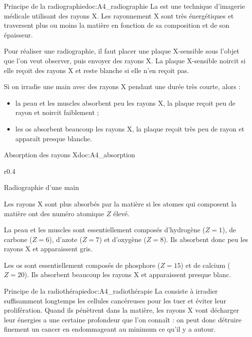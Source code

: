 \begin{doc}{Principe de la radiographie}{doc:A4_radiographie}
  La  est une technique d'imagerie médicale utilisant des rayons X.
  Les rayonnement X sont très énergétiques et traversent plus ou moins la matière en fonction de sa composition et de son épaisseur.

  Pour réaliser une radiographie, il faut placer une plaque X-sensible sous l'objet que l'on veut observer, puis envoyer des rayons X.
  La plaque X-sensible noircit si elle reçoit des rayons X et reste blanche si elle n'en reçoit pas.

  Si on irradie une main avec des rayons X pendant une durée très courte, alors :
  \begin{itemize}
    \item la peau et les muscles absorbent peu les rayons X, la plaque reçoit peu de rayon et noircit faiblement ;
    \item les os absorbent beaucoup les rayons X, la plaque reçoit très peu de rayon et apparaît presque blanche.
  \end{itemize}
\end{doc}

\begin{doc}{Absorption des rayons X}{doc:A4_absorption}
  \begin{wrapfigure}{r}{0.4\linewidth}
    \vspace*{-34pt}

    \centering Radiographie d'une main    
  \end{wrapfigure}
  
  Les rayons X sont plus absorbés par la matière si les atomes qui composent la matière ont des numéro atomique $Z$ élevé.
  \begin{listePoints}
    \item La peau et les muscles sont essentiellement composés d'hydrogène ($Z = 1$), de carbone ($Z = 6$), d'azote ($Z = 7$) et d'oxygène  ($Z = 8$).
    Ils absorbent donc peu les rayons X et apparaissent gris.
    \item Les os sont essentiellement composés de phosphore ($Z = 15$) et de calcium ($Z = 20$).
    Ils absorbent beaucoup les rayons X et apparaissent presque blanc.
  \end{listePoints}
\end{doc}

\begin{doc}{Principe de la radiothérapie}{doc:A4_radiothérapie}
  La  consiste à irradier suffisamment longtemps les cellules cancéreuses pour les tuer et éviter leur prolifération.
  Quand ils pénètrent dans la matière, les rayons X vont décharger leur énergies a une certaine profondeur que l'on connaît : on peut donc détruire finement un cancer en endommageant au minimum ce qu'il y a autour.
\end{doc}


